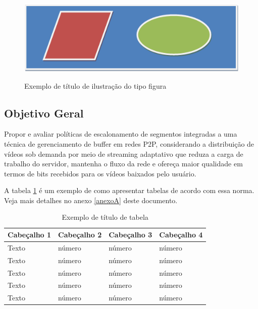 \documentclass[
	12pt,				%
	oneside,			%
	a4paper,			%
	english,			%
	brazil				%
	]{abntex2ppgsi}
\begin{document}
\begin{figure}[htbp]
	\centering
	\caption{Exemplo de título de ilustração do tipo figura}
		\includegraphics{figuras/figura-exemplo.png}
	\label{fig:figura-exemplo3}
\end{figure}

\subsection{Objetivo Geral}

Propor e avaliar políticas de escalonamento de segmentos integradas a uma técnica de gerenciamento de buffer em redes P2P, considerando a distribuição de vídeos sob demanda por meio de streaming adaptativo que reduza a carga de trabalho do servidor, mantenha o fluxo da rede e ofereça maior qualidade em termos de bits recebidos para os vídeos baixados pelo usuário.



A tabela \ref{tab:ExemploDeTabela3} é um exemplo de como apresentar tabelas de acordo com essa norma. Veja mais detalhes no anexo \ref{anexoA} deste documento.

\begin{table}[htbp]
	\centering
	\caption{Exemplo de título de tabela}
		\begin{tabular}{p{0.85in} p{0.85in} p{0.85in} p{0.85in} } \hline
		
		Cabeçalho 1	& Cabeçalho 2	& Cabeçalho 3	& Cabeçalho 4 \\ \hline
		Texto	& número & número	& número \\ 
		Texto	& número & número	& número \\ 
		Texto	& número & número	& número \\ 
		Texto	& número & número	& número \\ 
		Texto	& número & número	& número \\ \hline
			
		\end{tabular}
	\label{tab:ExemploDeTabela3}
\end{table}
\end{document}
